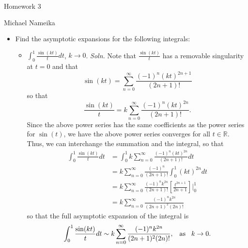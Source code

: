 \documentclass{article}
\begin{document}
\begin{center}
    {\huge Homework 3}
    \vspace{0.5cm}

    {\large Michael Nameika}
\end{center}

\begin{itemize}
    \item[6.1.3] Find the asymptotic expansions for the following integrals:
    \begin{itemize}
        \item[(a)] ${\displaystyle \int_0^1\frac{\sin(kt)}{t}dt}$, $k \to 0$.
        \newline\newline
        \textit{Soln.} Note that $\frac{\sin(kt)}{t}$ has a removable singularity at $t = 0$ and that 
        \[\sin(kt) = \sum_{n = 0}^{\infty}\frac{(-1)^n(kt)^{2n+1}}{(2n+1)!}\]
        so that 
        \[\frac{\sin(kt)}{t} = k\sum_{n = 0}^{\infty}\frac{(-1)^n(kt)^{2n}}{(2n+1)!}.\]
        Since the above power series has the same coefficients as the power series for $\sin(t)$, we have the above power series converges for all $t \in \mathbb{R}$. Thus, we can interchange the summation and the integral, so that
        \begin{align*}
            \int_0^1 \frac{\sin(kt)}{t}dt &= \int_0^1 k\sum_{n = 0}^{\infty} \frac{(-1)^n(kt)^{2n}}{(2n + 1)!}dt\\
            &= k\sum_{n = 0}^{\infty}\frac{(-1)^n}{(2n + 1)!}\int_0^1(kt)^{2n}dt\\
            &= k\sum_{n = 0}^{\infty}\frac{(-1)^nk^{2n}}{(2n + 1)!}\left[\frac{t^{2n+1}}{2n+1}\right]\bigg|_0^1\\
            &= k\sum_{n = 0}^{\infty}\frac{(-1)^nk^{2n}}{(2n+1)^2(2n)!}
        \end{align*}
        so that the full asymptotic expansion of the integral is
        \[\int_0^1\frac{\sin(kt)}{t}dt \sim k\sum_{n = 0}^{\infty}\frac{(-1)^nk^{2n}}{(2n+1)^2(2n)!}, \hspace{0.3cm} \text{as} \hspace{0.3cm} k \to 0.\]


\end{itemize}
\end{itemize}
\end{document}
